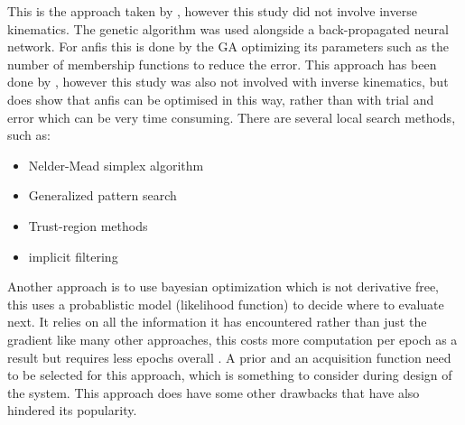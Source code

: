\documentclass[a4paper,11pt]{article}
\begin{document}
This is the approach taken by \cite{bpannGa} , however this study did not involve inverse kinematics. The genetic algorithm was used alongside a back-propagated neural network.
For anfis this is done by the GA optimizing its parameters such as the number of membership functions to reduce the error. This approach has been done by \cite{anfisGa}, however this study was also not involved with inverse kinematics, but does show that anfis can be optimised in this way, rather than with trial and error which can be very time consuming.
\newline
\newline
There are several local search methods\citep{searchpaper}, such as:
\begin{itemize}
  \item Nelder-Mead simplex algorithm
  \item Generalized pattern search
  \item Trust-region methods
  \item implicit filtering
\end{itemize}

Another approach is to use bayesian optimization which is not derivative free, this uses a probablistic model (likelihood function) to decide where to evaluate next. It relies on all the information it has encountered rather than just the gradient like many other approaches, this costs more computation per epoch as a result but requires less epochs overall \citep{bayesopt}. A prior and an acquisition function need to be selected for this approach, which is something to consider during design of the system. This approach does have some other drawbacks that have also hindered its popularity.



\clearpage

\end{document}
